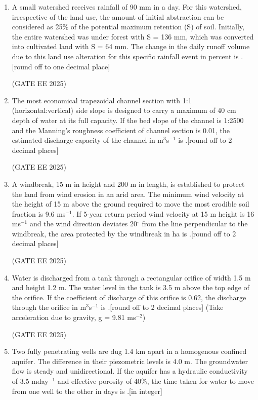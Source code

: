 \documentclass[journal,12pt,onecolumn]{IEEEtran}
\theoremstyle{remark}
\begin{document}
\begin{enumerate}
\item A small watershed receives rainfall of 90 mm in a day. For this watershed, irrespective of the land use, the amount of initial abstraction can be considered as 25\% of the potential maximum retention (S) of soil. Initially, the entire watershed was under forest with S = 136 mm, which was converted into cultivated land with S = 64 mm. The change in the daily runoff volume due to this land use alteration for this specific rainfall event in percent is \underline{\hspace{2cm}}.{[round off to one decimal place]}

\hfill(GATE EE 2025)

\item The most economical trapezoidal channel section with 1:1 (horizontal:vertical) side slope is designed to carry a maximum of 40 cm depth of water at its full capacity. If the bed slope of the channel is 1:2500 and the Manning's roughness coefficient of channel section is 0.01, the estimated discharge capacity of the channel in m$^3$s$^{-1}$ is \underline{\hspace{2cm}}.{[round off to 2 decimal places]}

\hfill(GATE EE 2025)

\item A windbreak, 15 m in height and 200 m in length, is established to protect the land from wind erosion in an arid area. The minimum wind velocity at the height of 15 m above the ground required to move the most erodible soil fraction is 9.6 ms$^{-1}$. If 5-year return period wind velocity at 15 m height is 16 ms$^{-1}$ and the wind direction deviates 20$^\circ$ from the line perpendicular to the windbreak, the area protected by the windbreak in ha is \underline{\hspace{2cm}}.{[round off to 2 decimal places]}

\hfill(GATE EE 2025)

\item Water is discharged from a tank through a rectangular orifice of width 1.5 m and height 1.2 m. The water level in the tank is 3.5 m above the top edge of the orifice. If the coefficient of discharge of this orifice is 0.62, the discharge through the orifice in m$^3$s$^{-1}$ is \underline{\hspace{2cm}}.{[round off to 2 decimal places]} 
(Take acceleration due to gravity, g = 9.81 ms$^{-2}$)

\hfill(GATE EE 2025)

\item Two fully penetrating wells are dug 1.4 km apart in a homogenous confined aquifer. The difference in their piezometric levels is 4.0 m. The groundwater flow is steady and unidirectional. If the aquifer has a hydraulic conductivity of 3.5 mday$^{-1}$ and effective porosity of 40\%, the time taken for water to move from one well to the other in days is \underline{\hspace{2cm}}.{[in integer]}


\end{enumerate}
\end{document}
